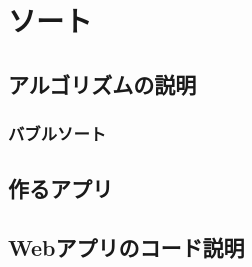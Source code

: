 \chapter{ソート}
\label{chap:chap03-sort}

\section{アルゴリズムの説明}
\label{sec:3-1}

\subsection*{バブルソート}
\label{sec:3-1-1}

\section{作るアプリ}
\label{sec:3-2}

\section{Webアプリのコード説明}
\label{sec:3-3}
